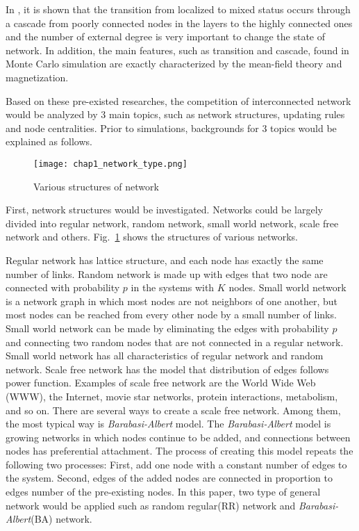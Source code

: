 In \parencite{gomez2015}, it is shown that the transition from localized to mixed status occurs through a cascade from poorly connected nodes in the layers to the highly connected ones and the number of external degree is very important to change the state of network. In addition, the main features, such as transition and cascade, found in Monte Carlo simulation are exactly characterized by the mean-field theory and magnetization\parencite{alvarez2016, diep2017, amato2017, gomez2015}. 

Based on these pre-existed researches, the competition of interconnected network would be analyzed by 3 main topics, such as network structures, updating rules and node centralities. Prior to simulations, backgrounds for 3 topics would be explained as follows. 
\begin{figure}[!htb]
	\centering
	\texttt{[image: chap1\_network\_type.png]}
	\caption{Various structures of network}
	\label{chap1_network_type}
\end{figure}
First, network structures would be investigated. Networks could be largely divided into regular network, random network\parencite{erdos1960}, small world network\parencite{watts1998}, scale free network\parencite{barabasi1999} and others. Fig.~\ref{chap1_network_type} shows the structures of various networks.

Regular network has lattice structure, and  each node has exactly the same number of links. Random network is made up with edges that two node are connected with probability $p$ in the systems with $K$ nodes. Small world network is a network graph in which most nodes are not neighbors of one another, but most nodes can be reached from every other node by a small number of links. Small world network can be made by eliminating the edges with probability $p$ and connecting two random nodes that are not connected in a regular network. Small world network has all characteristics of regular network and random network.
Scale free network has the model that distribution of edges follows power function. Examples of scale free network are the World Wide Web (WWW), the Internet, movie star networks, protein interactions, metabolism, and so on. There are several ways to create a scale free network. Among them, the most typical way is \textit{Barabasi-Albert} model. The \textit{Barabasi-Albert} model is growing networks in which nodes continue to be added, and connections between nodes has preferential attachment. The process of creating this model repeats the following two processes: First, add one node with a constant number of edges to the system. Second, edges of the added nodes are connected in proportion to edges number of the pre-existing nodes. In this paper, two type of general network would be applied such as random regular(RR) network and \textit{Barabasi-Albert}(BA) network. 

